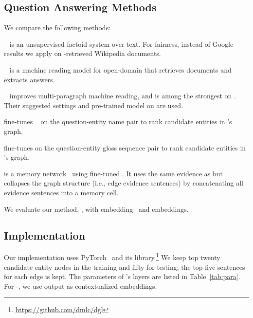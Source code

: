 \subsection{Question Answering Methods}
We compare the following methods:
\begin{itemize*}
\item \quest{}~\cite{Lu:2019:ACQ} is an unsupervised factoid 
  system over text. For fairness, instead of Google results we apply \quest{} on -retrieved 
Wikipedia documents.

\item \drqa{}~\cite{chen2017reading} is a machine reading model for open-domain 
   that retrieves documents and extracts answers.
  
\item \docqa{}~\cite{clark2018simple} improves multi-paragraph machine reading, 
and is among the strongest on \triviaqa{}. Their suggested settings 
and pre-trained model on \triviaqa{} are used.

\item \bertet{} fine-tunes \bert{}~\cite{devlin2018bert} on the question-entity name pair to rank candidate entities in \name{}'s  graph.
  
\item \bertsent{} fine-tunes \bert{} on the question-entity gloss sequence pair to rank candidate entities in \name{}'s  graph.
  
\item \memnn{} is a memory network~\cite{weston2014memory} using fine-tuned \bert{}.
It uses the same evidence as \name{} but collapses the 
graph structure (i.e., edge evidence sentences) by concatenating all
evidence sentences into a memory cell.

\item We evaluate our method, \name{}, with \glove{} embedding~\cite{pennington2014glove} and \bert{} embeddings.
\end{itemize*}




\subsection{Implementation}





Our implementation uses PyTorch~\cite{paszke2017automatic} and its   library.\footnote{\url{https://github.com/dmlc/dgl}}
%
We keep top twenty candidate entity nodes in the training and fifty for testing; the top five sentences for each edge is kept.
%
The parameters of \name{}'s  layers are listed in Table~\ref{tab:para}. For \name{}-\bert{}, we use \bert{} 
output as contextualized embeddings. 

